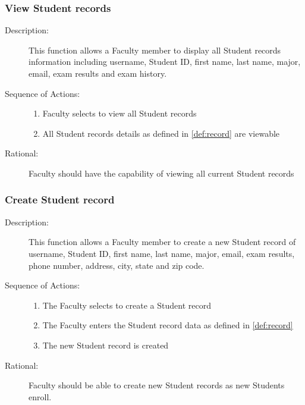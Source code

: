    \subsubsection{\large View Student records} 
   \begin{boxed} %
      \begin{description}
         \item[Description:\label{desc:view_records}]
      This function allows a Faculty member to display all Student
         records information including username, Student ID, first name, last
         name, major, email, exam results and exam history.
         
            \item[Sequence of Actions:]\hspace{10cm}
         \begin{enumerate}
            \item Faculty selects to view all Student records
            \item All Student records details as defined in \ref{def:record} are viewable
      \end{enumerate}

            \item[Rational:]
         Faculty should have the capability of viewing all current Student
         records
      \end{description}
   \end{boxed} %

   \subsubsection{\large Create Student record} 
   \begin{boxed} %
      \begin{description}
         \item[Description:\label{desc:create_record}]
      This function allows a Faculty member to create a new Student
         record of username, Student ID, first name, last name, major, email,
         exam results, phone number, address, city, state and zip code.
         
            \item[Sequence of Actions:]\hspace{10cm}
         \begin{enumerate}
            \item The Faculty selects to create a Student record
            \item The Faculty enters the Student record data as defined in
               \ref{def:record}
            \item The new Student record is created
      \end{enumerate}

            \item[Rational:]
         Faculty should be able to create new Student records as new Students
         enroll.
      \end{description}
   \end{boxed} %


